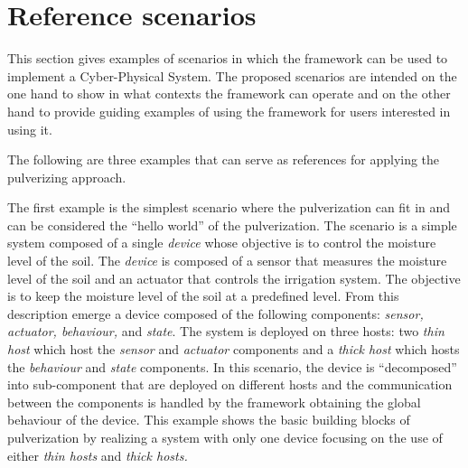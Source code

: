 
\section{Reference scenarios}
\label{sec:reference-scenarios}

This section gives examples of scenarios in which the framework can be used to implement a Cyber-Physical System.
The proposed scenarios are intended on the one hand to show in what contexts the framework can operate and on the other hand to provide guiding
examples of using the framework for users interested in using it.

The following are three examples that can serve as references for applying the pulverizing approach.

The first example is the simplest scenario where the pulverization can fit in and can be considered the ``hello world'' of the pulverization.
The scenario is a simple system composed of a single \emph{device} whose objective is to control the moisture level of the soil.
The \emph{device} is composed of a sensor that measures the moisture level of the soil and an actuator that controls the irrigation system.
The objective is to keep the moisture level of the soil at a predefined level. From this description emerge a device composed of the following
components: \emph{sensor, actuator, behaviour,} and \emph{state}. The system is deployed on three hosts: two \emph{thin host} which host the
\emph{sensor} and \emph{actuator} components and a \emph{thick host} which hosts the \emph{behaviour} and \emph{state} components.
In this scenario, the device is ``decomposed'' into sub-component that are deployed on different hosts and the communication between the
components is handled by the framework obtaining the global behaviour of the device. This example shows the basic building blocks of pulverization
by realizing a system with only one device focusing on the use of either \emph{thin hosts} and \emph{thick hosts.}

